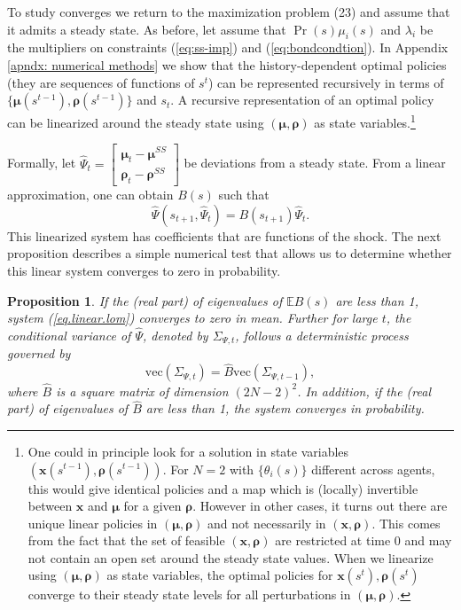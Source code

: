 \documentclass[thmsb,11pt]{article}
\newtheorem{proposition}{Proposition}
\newcommand{\bmat}{\begin{matrix}}
\newcommand{\emat}{\end{matrix}}
\begin{document}
To study converges we return to the maximization problem (23) and assume that it admits a steady state. As before, let assume that $\Pr(s)\mu_i(s)$ and $\lambda_i$ be the multipliers on constraints (\ref{eq:ss-imp}) and (\ref{eq:bondcondtion}). In Appendix \ref{apndx: numerical methods} we show that the history-dependent optimal policies (they are sequences of functions of $s^t$) can be represented  recursively in terms of $\{\bm \mu(s^{t-1}),\bm \rho(s^{t-1})\}$ and $s_t$. A recursive representation of an optimal policy can be linearized around the steady state using $(\bm{\mu},\bm{\rho})$ as state variables.\footnote{One could  in principle look for a solution in state variables $\left(\bm{x}(s^{t-1}),\bm{\rho}(s^{t-1})\right)$. For $N=2$ with $\{\theta_i(s)\}$ different across agents, this would give identical policies and a map which is (locally) invertible between $\bm{x}$ and $\bm{\mu}$ for a given $\bm{\rho}$. However in other cases, it turns out there are unique linear policies in $(\bm{\mu},\bm{\rho}
)$ and not necessarily in  $(\bm{x},\bm{\rho})$. This comes from the fact that the set of feasible $(\bm{x},\bm{\rho})$ are restricted at time 0 and may not contain an open set around the steady state values. When we linearize using $(\bm{\mu},\bm{\rho})$ as state variables, the optimal policies for $\bm{x}(s^t),\bm{\rho}(s^t)$ converge to their  steady state levels for all perturbations in $(\bm{\mu},\bm{\rho})$.}

Formally, let $\hat{\Psi}_{t}= \left[\bmat \bm{\mu}_{t} - \bm{\mu}^{SS}\\ \bm \rho_t - \bm \rho^{SS}\emat\right]$ be  deviations from a steady state. From a  linear approximation, one can obtain $B(s)$ such that
\begin{equation}
 \hat{\Psi}(s_{t+1},\hat{\Psi}_t)=B(s_{t+1})\hat{\Psi}_t. \label{eq.linear.lom}
\end{equation}
This linearized system has coefficients that are functions of the shock. The next proposition describes a simple numerical test that allows us to determine whether  this linear system converges to zero in probability.

\begin{proposition}\label{prop: localstability}
If the (real part) of eigenvalues of $\mathbb{E}B(s)$ are less than 1,  system (\ref{eq.linear.lom}) converges to zero  in mean. Further for large $t$, the conditional variance of $\hat{\Psi}$, denoted by $\Sigma_{\Psi,t}$, follows a deterministic process governed by
\[\text{vec}(\Sigma_{\Psi,t})=\hat{B} \text{vec}(\Sigma_{\Psi,t-1}),\]	
where $\hat{B}$ is a square matrix of dimension $(2N-2)^2$. In addition,  if the (real part) of eigenvalues of $\hat{B}$ are less than 1, the system converges in probability.
\end{proposition}
\end{document}

